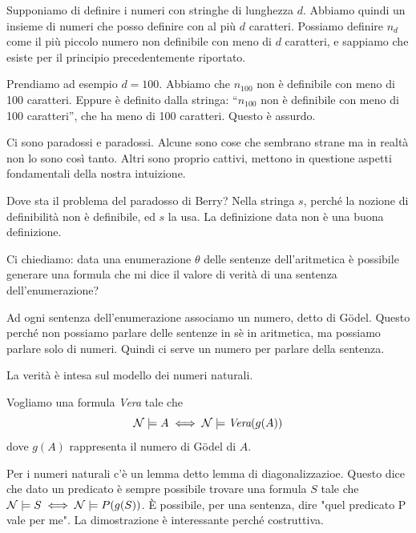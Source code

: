 Supponiamo di definire i numeri con stringhe di lunghezza $d$. Abbiamo quindi un insieme di numeri
che posso definire con al più $d$ caratteri. Possiamo definire $n_d$ come il più piccolo numero
non definibile con meno di $d$ caratteri, e sappiamo che esiste per il principio precedentemente
riportato.

Prendiamo ad esempio $d=100$. Abbiamo che $n_{100}$ non è definibile con meno di 100 caratteri. Eppure
è definito dalla stringa: ``$n_{100}$ non è definibile con meno di 100 caratteri'', che ha meno di 100
caratteri. Questo è assurdo.


Ci sono paradossi e paradossi. Alcune sono cose che sembrano strane ma in realtà non lo sono così
tanto. Altri sono proprio cattivi, mettono in questione aspetti fondamentali della nostra
intuizione.

Dove sta il problema del paradosso di Berry? Nella stringa $s$, perché la nozione di definibilità non
è definibile, ed $s$ la usa. La definizione data non è una buona definizione.

Ci chiediamo: data una enumerazione $\theta$ delle sentenze dell'aritmetica è possibile generare una
formula che mi dice il valore di verità di una sentenza dell'enumerazione?

Ad ogni sentenza dell'enumerazione associamo un numero, detto di Gödel. Questo perché non possiamo
parlare delle sentenze in sè in aritmetica, ma possiamo parlare solo di numeri. Quindi ci serve un
numero per parlare della sentenza.

La verità è intesa sul modello dei numeri naturali.

Vogliamo una formula \textit{Vera} tale che
\begin{equation*}
    \mathcal{N} \models A \iff \mathcal{N} \models \textit{Vera}(g(A))
\end{equation*}
dove $g(A)$ rappresenta il numero di Gödel di $A$.

Per i numeri naturali c'è un lemma detto lemma di diagonalizzazioe. Questo dice che dato un
predicato è sempre possibile trovare una formula $S$ tale che $\mathcal{N} \models S \iff \mathcal{N} \models
P(g(S))$. È possibile, per una sentenza, dire "quel predicato P vale per me". La dimostrazione è
interessante perché costruttiva.

